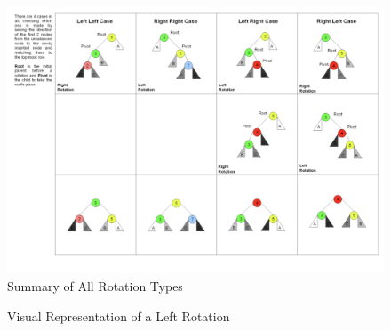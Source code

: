 \documentclass[a4paper,12pt]{report}
\begin{document}
\begin{figure}[h]
\centering
\includegraphics[width=1\textwidth]{media/tree-rotation-summary.png}
\caption{Summary of All Rotation Types}
\label{Tree Rotation Summary}
\end{figure}


\begin{figure}%
    \centering
    \qquad
    \caption{Visual Representation of a Left Rotation}%
    \label{fig:example}%
\end{figure}
\end{document}
